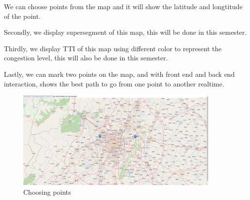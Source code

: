 \documentclass[fontset=none]{ctexart}
\theoremstyle{definition}
\theoremstyle{remark}
\begin{document}
      We can choose points from the map and it will show the latitude and longtitude of the point.

      Secondly, we display supersegment of this map, this will be done in this semester.

      Thirdly, we display TTI of this map using different color to represent the congestion level, this will also be done in this semester.

      Lastly, we can mark two points on the map, and with front end and back end interaction, shows the best path to go from one point to another realtime.

      \begin{figure}[H]
          \centering
          \includegraphics[width=0.9\textwidth]{images/Choice.jpg}
          \newline
          \caption{Choosing points}
      \end{figure}

% 
% 
\end{document}

